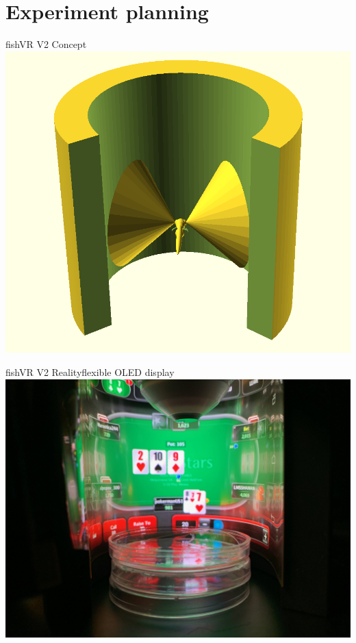 \section{Experiment planning}

\begin{frame}{fishVR V2 Concept}{}
	\centering
	\includegraphics[height=0.9\textheight]{media/zfish_render}
\end{frame}{}

\begin{frame}{fishVR V2 Reality}{flexible OLED display}
	\centering
	\includegraphics[height=0.9\textheight]{media/poker-fish}
\end{frame}{}

